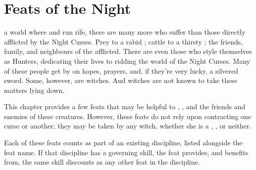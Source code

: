 \chapter{Feats of the Night}

 a world where {\werewolves} and {\vampires} run rife, there are many more who suffer than those directly afflicted by the Night Curses.
Prey to a rabid {\werewolf}; cattle to a thirsty {\vampire}; the friends, family, and neighbours of the afflicted.
There are even those who style themselves as Hunters, dedicating their lives to ridding the world of the Night Curses.
Many of these people get by on hopes, prayers, and, if they're very lucky, a silvered sword.
Some, however, are witches.
And witches are not known to take these matters lying down.

This chapter provides a few feats that may be helpful to {\werewolves}, {\vampires}, and the friends and enemies of these creatures.
However, these feats do not rely upon contracting one curse or another; they may be taken by any witch, whether she is a {\werewolf}, {\vampire}, or neither.

Each of these feats counts as part of an existing discipline, listed alongside the feat name.
If that discipline has a governing skill, the feat provides, and benefits from, the same skill discounts as any other feat in the discipline.
